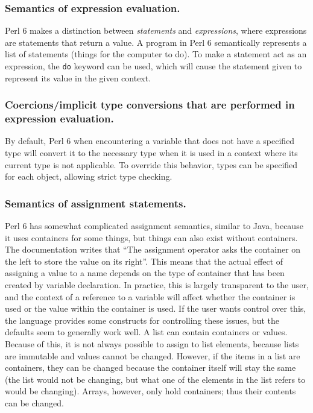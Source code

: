 \documentclass[17pt,english]{extarticle}
\begin{document}
\subsubsection*{Semantics of expression evaluation.}

Perl 6 makes a distinction between \emph{statements} and \emph{expressions},
where expressions are statements that return a value. A program in
Perl 6 semantically represents a list of statements (things for the
computer to do). To make a statement act as an expression, the \texttt{do}
keyword can be used, which will cause the statement given to represent
its value in the given context.


\subsubsection*{Coercions/implicit type conversions that are performed in expression
evaluation.}

By default, Perl 6 when encountering a variable that does not have
a specified type will convert it to the necessary type when it is
used in a context where its current type is not applicable. To override
this behavior, types can be specified for each object, allowing strict
type checking.


\subsubsection*{Semantics of assignment statements.}

Perl 6 has somewhat complicated assignment semantics, similar to Java,
because it uses containers for some things, but things can also exist
without containers. The documentation writes that ``The assignment
operator asks the container on the left to store the value on its
right''. This means that the actual effect of assigning a value to
a name depends on the type of container that has been created by variable
declaration. In practice, this is largely transparent to the user,
and the context of a reference to a variable will affect whether the
container is used or the value within the container is used. If the
user wants control over this, the language provides some constructs
for controlling these issues, but the defaults seem to generally work
well. A list can contain containers or values. Because of this, it
is not always possible to assign to list elements, because lists are
immutable and values cannot be changed. However, if the items in a
list are containers, they can be changed because the container itself
will stay the same (the list would not be changing, but what one of
the elements in the list refers to would be changing). Arrays, however,
only hold containers; thus their contents can be changed. 
\end{document}
